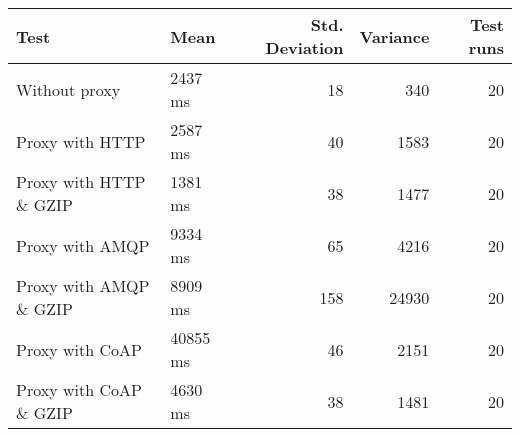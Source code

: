 \begin{tabularx}{\textwidth}{llrrr}
\hline
 Test                   & Mean     &   Std. Deviation &   Variance &   Test runs \\
\hline
 Without proxy          & 2437 ms  &               18 &        340 &          20 \\
 Proxy with HTTP        & 2587 ms  &               40 &       1583 &          20 \\
 Proxy with HTTP \& GZIP & 1381 ms  &               38 &       1477 &          20 \\
 Proxy with AMQP        & 9334 ms  &               65 &       4216 &          20 \\
 Proxy with AMQP \& GZIP & 8909 ms  &              158 &      24930 &          20 \\
 Proxy with CoAP        & 40855 ms &               46 &       2151 &          20 \\
 Proxy with CoAP \& GZIP & 4630 ms  &               38 &       1481 &          20 \\
\hline
\end{tabularx}